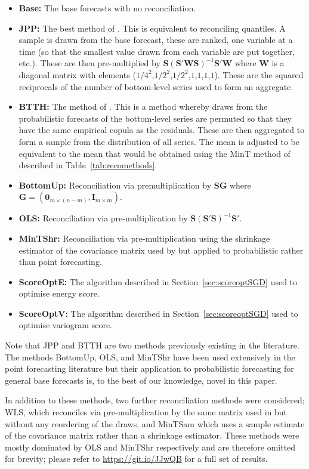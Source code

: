 \documentclass[11pt]{article}
\theoremstyle{definition}
\begin{document}
\begin{itemize}
	\item \textbf{Base:} The base forecasts with no reconciliation.
	\item \textbf{JPP:} The best method of \cite{JeoEtAl2019}. This is equivalent to reconciling quantiles. A sample is drawn from the base forecast, these are ranked, one variable at a time (so that the smallest value drawn from each variable are put together, etc.). These are then pre-multiplied by $\bm{S}\left(\bm{S}'\bm{W}\bm{S}\right)^{-1}\bm{S}'\bm{W}$ where $\bm{W}$ is a diagonal matrix with elements ($1/4^2$,$1/2^2$,$1/2^2$,$1$,$1$,$1$,$1$). These are the squared reciprocals of the number of bottom-level series used to form an aggregate.
	\item \textbf{BTTH:} The method of \cite{Taieb2017}. This is a method whereby draws from the probabilistic forecasts of the bottom-level series are permuted so that they have the same empirical copula as the residuals. These are then aggregated to form a sample from the distribution of all series. The mean is adjusted to be equivalent to the mean that would be obtained using the MinT method of \cite{WicEtAl2019} described in Table~\ref{tab:recomethods}.
	\item \textbf{BottomUp:} Reconciliation via premultiplication by $\bm{S}\bm{G}$ where $\bm{G}=\left(\bm{0}_{m\times(n-m)},\bm{I}_{m\times m}\right)$.
	\item \textbf{OLS:} Reconciliation via pre-multiplication by $\bm{S}\left(\bm{S}'\bm{S}\right)^{-1}\bm{S}'$.
	\item \textbf{MinTShr:} Reconciliation via pre-multiplication using the shrinkage estimator of the covariance matrix used by \cite{WicEtAl2019} but applied to probabilistic rather than point forecasting.
	\item \textbf{ScoreOptE:} The algorithm described in Section~\ref{sec:scoreoptSGD} used to optimise energy score.
	\item \textbf{ScoreOptV:} The algorithm described in Section~\ref{sec:scoreoptSGD} used to optimise variogram score.
\end{itemize}

Note that JPP and BTTH are two methods previously existing in the literature. The methods BottomUp, OLS, and MinTShr have been used extensively in the point forecasting literature but their application to probabilistic forecasting for general base forecasts is, to the best of our knowledge, novel in this paper.

In addition to these methods, two further reconciliation methods were considered; WLS, which reconciles via pre-multiplication by the same matrix used in \cite{JeoEtAl2019} but without any reordering of the draws, and MinTSam which uses a sample estimate of the covariance matrix rather than a shrinkage estimator. These methods were mostly dominated by OLS and MinTShr respectively and are therefore omitted for brevity; please refer to \url{https://git.io/JJwQB} for a full set of results.
\end{document}
